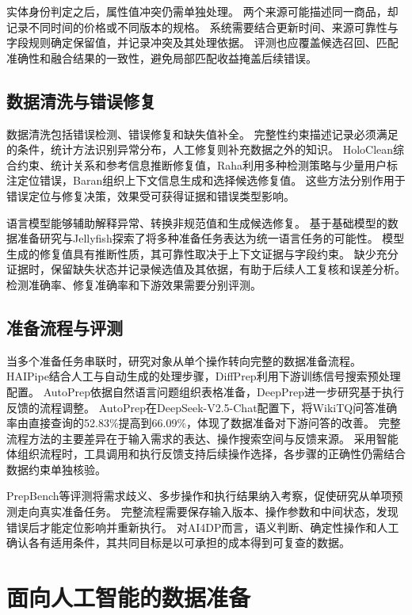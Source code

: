 实体身份判定之后，属性值冲突仍需单独处理。
两个来源可能描述同一商品，却记录不同时间的价格或不同版本的规格。
系统需要结合更新时间、来源可靠性与字段规则确定保留值，并记录冲突及其处理依据。
评测也应覆盖候选召回、匹配准确性和融合结果的一致性，避免局部匹配收益掩盖后续错误。

\subsection{数据清洗与错误修复}

数据清洗包括错误检测、错误修复和缺失值补全。
完整性约束描述记录必须满足的条件，统计方法识别异常分布，人工修复则补充数据之外的知识。
HoloClean综合约束、统计关系和参考信息推断修复值，Raha利用多种检测策略与少量用户标注定位错误，Baran组织上下文信息生成和选择候选修复值。\cite{holoclean,raha,baran}
这些方法分别作用于错误定位与修复决策，效果受可获得证据和错误类型影响。

语言模型能够辅助解释异常、转换非规范值和生成候选修复。
基于基础模型的数据准备研究与Jellyfish探索了将多种准备任务表达为统一语言任务的可能性。\cite{fm,jellyfish}
模型生成的修复值具有推断性质，其可靠性取决于上下文证据与字段约束。
缺少充分证据时，保留缺失状态并记录候选值及其依据，有助于后续人工复核和误差分析。
检测准确率、修复准确率和下游效果需要分别评测。

\subsection{准备流程与评测}

当多个准备任务串联时，研究对象从单个操作转向完整的数据准备流程。
HAIPipe结合人工与自动生成的处理步骤，DiffPrep利用下游训练信号搜索预处理配置。\cite{haipipe,diffprep}
AutoPrep依据自然语言问题组织表格准备，DeepPrep进一步研究基于执行反馈的流程调整。\cite{autoprep,deepprep}
AutoPrep在DeepSeek-V2.5-Chat配置下，将WikiTQ问答准确率由直接查询的52.83\%提高到66.09\%，体现了数据准备对下游问答的改善。\cite{autoprep}
完整流程方法的主要差异在于输入需求的表达、操作搜索空间与反馈来源。
采用智能体组织流程时，工具调用和执行反馈支持后续操作选择，各步骤的正确性仍需结合数据约束单独核验。

PrepBench等评测将需求歧义、多步操作和执行结果纳入考察，促使研究从单项预测走向真实准备任务。\cite{prepbench}
完整流程需要保存输入版本、操作参数和中间状态，发现错误后才能定位影响并重新执行。
对AI4DP而言，语义判断、确定性操作和人工确认各有适用条件，其共同目标是以可承担的成本得到可复查的数据。

\section{面向人工智能的数据准备}

